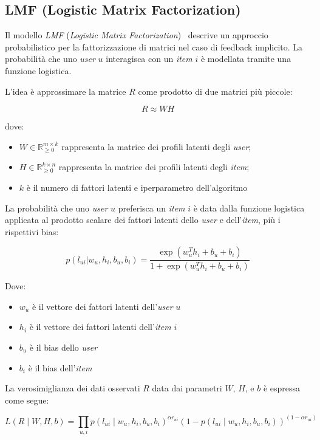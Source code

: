 \subsection{LMF (Logistic Matrix Factorization)}\label{lmf}

Il modello \textit{LMF} (\textit{Logistic Matrix Factorization})~\cite{LMF} descrive un approccio probabilistico per la fattorizzazione di matrici nel caso di feedback implicito. La probabilità che uno \textit{user} $u$ interagisca con un \textit{item} $i$ è modellata tramite una funzione logistica.

L'idea è approssimare la matrice $R$ come prodotto di due matrici più piccole:

\[
R \approx WH
\]

dove:
\begin{itemize}
    \item $W \in \mathbb{R}_{\geq 0}^{m \times k}$ rappresenta la matrice dei profili latenti degli \textit{user};
    \item $H \in \mathbb{R}_{\geq 0}^{k \times n}$ rappresenta la matrice dei profili latenti degli \textit{item};
    \item $k$ è il numero di fattori latenti e iperparametro dell'algoritmo
\end{itemize}

La probabilità che uno \textit{user} $u$ preferisca un \textit{item} $i$ è data dalla funzione logistica applicata al prodotto scalare dei fattori latenti dello \textit{user} e dell'\textit{item}, più i rispettivi bias:

\[
p(l_{ui} | w_u, h_i, b_u, b_i) = \frac{\exp(w_u^T h_i + b_u + b_i)}{1 + \exp(w_u^T h_i + b_u + b_i)}
\]

Dove:
\begin{itemize}
    \item $w_u$ è il vettore dei fattori latenti dell'\textit{user} $u$
    \item $h_i$ è il vettore dei fattori latenti dell'\textit{item} $i$
    \item $b_u$ è il bias dello \textit{user}
    \item $b_i$ è il bias dell'\textit{item}
\end{itemize}

La verosimiglianza dei dati osservati $R$ data dai parametri $W$, $H$, e $b$ è espressa come segue:

\[
L(R \mid W, H, b) = \prod_{u, i} p(l_{ui} \mid w_u, h_i, b_u, b_i)^{\alpha r_{ui}} 
\left( 1 - p(l_{ui} \mid w_u, h_i, b_u, b_i) \right)^{(1 - \alpha r_{ui})}
\]


